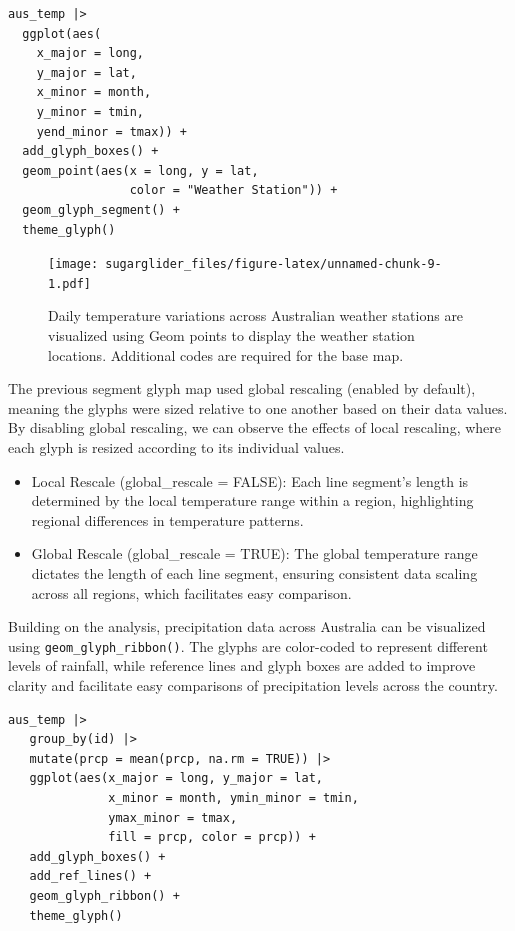 \begin{verbatim}
aus_temp |>
  ggplot(aes(
    x_major = long, 
    y_major = lat, 
    x_minor = month, 
    y_minor = tmin, 
    yend_minor = tmax)) +
  add_glyph_boxes() +
  geom_point(aes(x = long, y = lat,
                 color = "Weather Station")) +
  geom_glyph_segment() +
  theme_glyph()
\end{verbatim}

\begin{figure}
\centering
\texttt{[image: sugarglider\_files/figure-latex/unnamed-chunk-9-1.pdf]}
\caption{\label{fig:unnamed-chunk-9}Daily temperature variations across Australian weather stations are visualized using Geom points to display the weather station locations. Additional codes are required for the base map.}
\end{figure}

The previous segment glyph map used global rescaling (enabled by default), meaning the glyphs were sized relative to one another based on their data values. By disabling global rescaling, we can observe the effects of local rescaling, where each glyph is resized according to its individual values.

\begin{itemize}
\tightlist
\item
  Local Rescale (global\_rescale = FALSE): Each line segment's length is determined by the local temperature range within a region, highlighting regional differences in temperature patterns.
\item
  Global Rescale (global\_rescale = TRUE): The global temperature range dictates the length of each line segment, ensuring consistent data scaling across all regions, which facilitates easy comparison.
\end{itemize}

Building on the analysis, precipitation data across Australia can be visualized using \texttt{geom\_glyph\_ribbon()}. The glyphs are color-coded to represent different levels of rainfall, while reference lines and glyph boxes are added to improve clarity and facilitate easy comparisons of precipitation levels across the country.

\begin{verbatim}
aus_temp |>
   group_by(id) |>
   mutate(prcp = mean(prcp, na.rm = TRUE)) |>
   ggplot(aes(x_major = long, y_major = lat,
              x_minor = month, ymin_minor = tmin,
              ymax_minor = tmax, 
              fill = prcp, color = prcp)) +
   add_glyph_boxes() +
   add_ref_lines() +
   geom_glyph_ribbon() +
   theme_glyph()
\end{verbatim}

